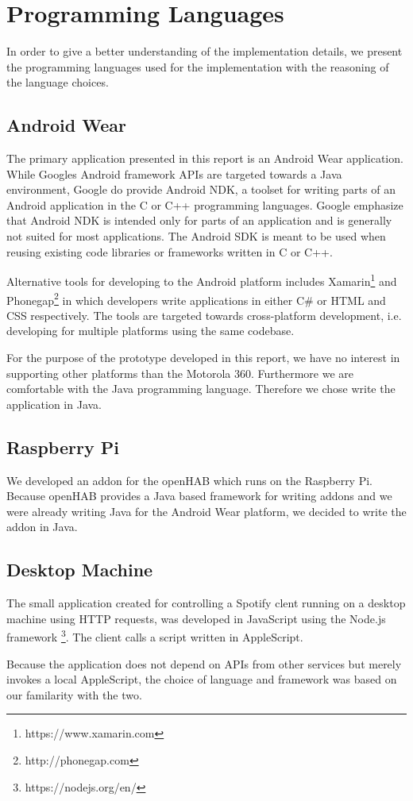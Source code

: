 \section{Programming Languages}
\label{sec:implementation:programming-language}

In order to give a better understanding of the implementation details, we present the programming languages used for the implementation with the reasoning of the language choices.

\subsection{Android Wear}

The primary application presented in this report is an Android Wear application. While Googles Android framework APIs are targeted towards a Java environment, Google do provide Android NDK, a toolset for writing parts of an Android application in the C or C++ programming languages. Google emphasize that Android NDK is intended only for parts of an application and is generally not suited for most applications. The Android SDK is meant to be used when reusing existing code libraries or frameworks written in C or C++.

Alternative tools for developing to the Android platform includes Xamarin\footnote{https://www.xamarin.com} and Phonegap\footnote{http://phonegap.com} in which developers write applications in either C\# or HTML and CSS respectively. The tools are targeted towards cross-platform development, i.e. developing for multiple platforms using the same codebase.

For the purpose of the prototype developed in this report, we have no interest in supporting other platforms than the Motorola 360. Furthermore we are comfortable with the Java programming language. Therefore we chose write the application in Java.

\subsection{Raspberry Pi}

We developed an addon for the openHAB which runs on the Raspberry Pi. Because openHAB provides a Java based framework for writing addons and we were already writing Java for the Android Wear platform, we decided to write the addon in Java.

\subsection{Desktop Machine}

The small application created for controlling a Spotify clent running on a desktop machine using HTTP requests, was developed in JavaScript using the Node.js framework \footnote{https://nodejs.org/en/}. The client calls a script written in AppleScript.

Because the application does not depend on APIs from other services but merely invokes a local AppleScript, the choice of language and framework was based on our familarity with the two.

